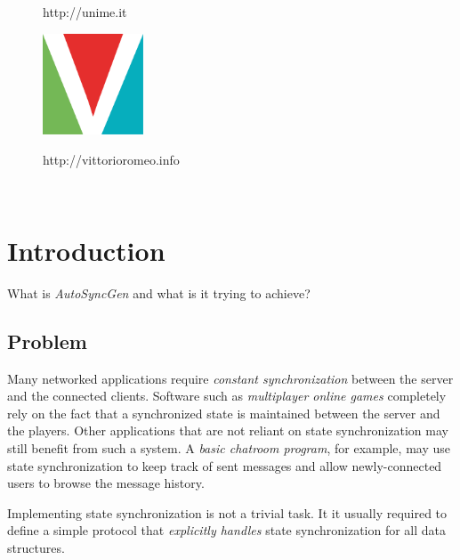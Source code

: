 \documentclass{report}
\begin{document}
\begin{titlepage}
\begin{minipage}{\linewidth}
\begin{minipage}{0.35\linewidth}
\begin{figure}[H]
                    http://unime.it
                \end{figure}
            \end{minipage}
            \hspace{0.27\linewidth}
            \begin{minipage}{0.35\linewidth}
                \begin{figure}[H]
                    \center
                    \includegraphics[width=3cm, height=3cm]{logovee}
                    
                    http://vittorioromeo.info
                \end{figure}
            \end{minipage}
        \end{minipage}\\[3cm]
    \end{titlepage}


    \tableofcontents
    \newpage
    
    \chapter{Introduction}
        What is \emph{AutoSyncGen} and what is it trying to achieve?
    
        \section{Problem}
            Many networked applications require \emph{constant synchronization} between the server and the connected clients. 
            Software such as \emph{multiplayer online games} completely rely on the fact that a synchronized state is maintained between the server and the players.
            Other applications that are not reliant on state synchronization may still benefit from such a system. 
            A \emph{basic chatroom program}, for example, may use state synchronization to keep track of sent messages and allow newly-connected users to browse the message history.

            Implementing state synchronization is not a trivial task. It it usually required to define a simple protocol that \emph{explicitly handles} state synchronization for all data structures. 
\end{document}
